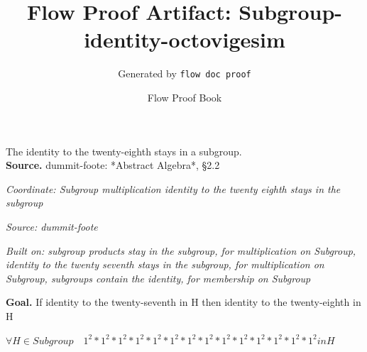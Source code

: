 \documentclass[11pt]{article}
\title{Flow Proof Artifact: Subgroup-identity-octovigesim}
\author{Generated by \texttt{flow doc proof}}
\date{Flow Proof Book}
\theoremstyle{definition}
\begin{document}
\maketitle
The identity to the twenty-eighth stays in a subgroup.\\[0.5em]
\textbf{Source.} dummit-foote: *Abstract Algebra*, §2.2\\[0.5em]
\bigskip
{}\par
\smallskip\noindent\textit{Coordinate: Subgroup \cdot multiplication \cdot identity to the twenty eighth stays in the subgroup}\par
\smallskip\noindent\textit{Source: dummit-foote}\par
\smallskip\noindent\textit{Built on: subgroup products stay in the subgroup, for multiplication on Subgroup, identity to the twenty seventh stays in the subgroup, for multiplication on Subgroup, subgroups contain the identity, for membership on Subgroup}\par
\medskip
\noindent\textbf{Goal.} If identity to the twenty-seventh in H then identity to the twenty-eighth in H\par
\noindent$\displaystyle \forall H \in Subgroup\quad 1^{2} * 1^{2} * 1^{2} * 1^{2} * 1^{2} * 1^{2} * 1^{2} * 1^{2} * 1^{2} * 1^{2} * 1^{2} * 1^{2} * 1^{2} * 1^{2} in H$\par
\medskip
\noindent
\end{document}
